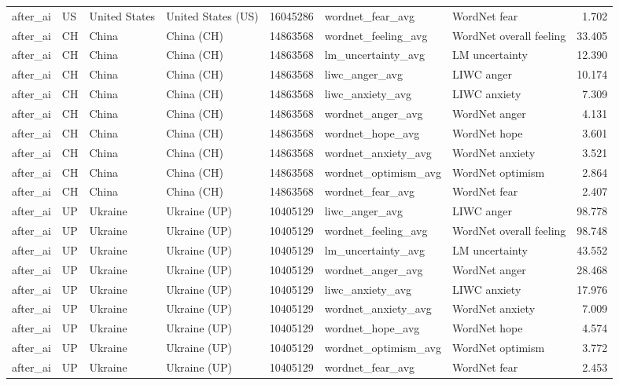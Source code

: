 \begin{tabular}{llllrllr}
after\_ai & US & United States & United States (US) & 16045286 & wordnet\_fear\_avg & WordNet fear & 1.702 \\
after\_ai & CH & China & China (CH) & 14863568 & wordnet\_feeling\_avg & WordNet overall feeling & 33.405 \\
after\_ai & CH & China & China (CH) & 14863568 & lm\_uncertainty\_avg & LM uncertainty & 12.390 \\
after\_ai & CH & China & China (CH) & 14863568 & liwc\_anger\_avg & LIWC anger & 10.174 \\
after\_ai & CH & China & China (CH) & 14863568 & liwc\_anxiety\_avg & LIWC anxiety & 7.309 \\
after\_ai & CH & China & China (CH) & 14863568 & wordnet\_anger\_avg & WordNet anger & 4.131 \\
after\_ai & CH & China & China (CH) & 14863568 & wordnet\_hope\_avg & WordNet hope & 3.601 \\
after\_ai & CH & China & China (CH) & 14863568 & wordnet\_anxiety\_avg & WordNet anxiety & 3.521 \\
after\_ai & CH & China & China (CH) & 14863568 & wordnet\_optimism\_avg & WordNet optimism & 2.864 \\
after\_ai & CH & China & China (CH) & 14863568 & wordnet\_fear\_avg & WordNet fear & 2.407 \\
after\_ai & UP & Ukraine & Ukraine (UP) & 10405129 & liwc\_anger\_avg & LIWC anger & 98.778 \\
after\_ai & UP & Ukraine & Ukraine (UP) & 10405129 & wordnet\_feeling\_avg & WordNet overall feeling & 98.748 \\
after\_ai & UP & Ukraine & Ukraine (UP) & 10405129 & lm\_uncertainty\_avg & LM uncertainty & 43.552 \\
after\_ai & UP & Ukraine & Ukraine (UP) & 10405129 & wordnet\_anger\_avg & WordNet anger & 28.468 \\
after\_ai & UP & Ukraine & Ukraine (UP) & 10405129 & liwc\_anxiety\_avg & LIWC anxiety & 17.976 \\
after\_ai & UP & Ukraine & Ukraine (UP) & 10405129 & wordnet\_anxiety\_avg & WordNet anxiety & 7.009 \\
after\_ai & UP & Ukraine & Ukraine (UP) & 10405129 & wordnet\_hope\_avg & WordNet hope & 4.574 \\
after\_ai & UP & Ukraine & Ukraine (UP) & 10405129 & wordnet\_optimism\_avg & WordNet optimism & 3.772 \\
after\_ai & UP & Ukraine & Ukraine (UP) & 10405129 & wordnet\_fear\_avg & WordNet fear & 2.453 \\

\end{tabular}

